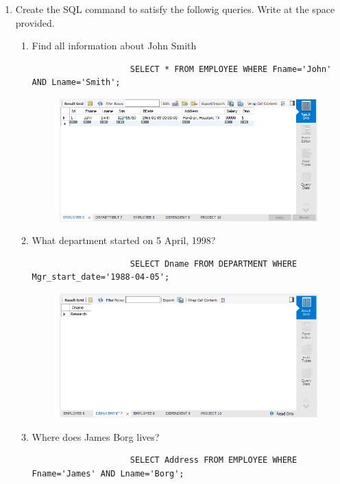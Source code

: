 \documentclass[12pt,titlepage]{article}
\begin{document}
\begin{enumerate}[label=\Alph*.]
    \item{
        Create the SQL command to satisfy the followig queries. Write at the space provided.
        \begin{enumerate}[label=\arabic*.]
            \item{
                Find all information about John Smith
                \begin{verbatim}
                    SELECT * FROM EMPLOYEE WHERE Fname='John' AND Lname='Smith';
                \end{verbatim}

                \begin{figure}[H]
                    \includegraphics[width=\textwidth]{images/figures/fig4.png}
                \end{figure}
            } 
            \item{
                What department started on 5 April, 1998?
                \begin{verbatim}
                    SELECT Dname FROM DEPARTMENT WHERE Mgr_start_date='1988-04-05';
                \end{verbatim}

                \begin{figure}[H]
                    \includegraphics[width=\textwidth]{images/figures/fig5.png}
                \end{figure}
            } 
            \item{
                Where does James Borg lives?
                \begin{verbatim}
                    SELECT Address FROM EMPLOYEE WHERE Fname='James' AND Lname='Borg';
                \end{verbatim}

}
\end{enumerate}}
\end{enumerate}
\end{document}
